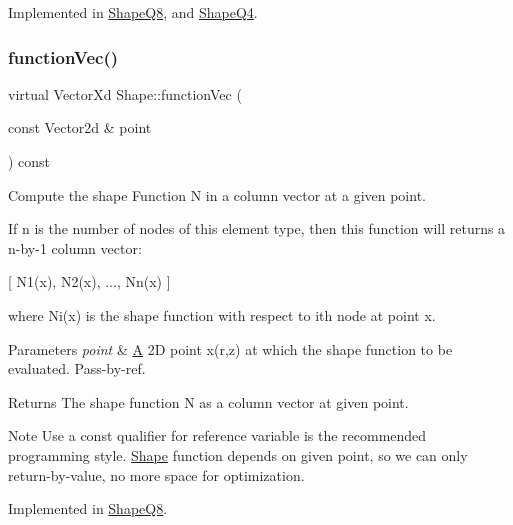 Implemented in \mbox{\hyperlink{class_shape_q8_a7e859a85ee52c8d3ab3051326fc09ab0}{Shape\+Q8}}, and \mbox{\hyperlink{class_shape_q4_a306cacfd4d87384b3d06c2788cafd4ba}{Shape\+Q4}}.

\mbox{\label{class_shape_a0e0400bca54c29b5097c84ace51ecc7b}} 
\subsubsection{\texorpdfstring{function\+Vec()}{functionVec()}}
{\footnotesize\ttfamily virtual Vector\+Xd Shape\+::function\+Vec (\begin{DoxyParamCaption}\item[{const Vector2d \&}]{point }\end{DoxyParamCaption}) const\hspace{0.3cm}{\ttfamily [pure virtual]}}



Compute the shape Function N in a column vector at a given point. 

If n is the number of nodes of this element type, then this function will returns a n-\/by-\/1 column vector\+:

\mbox{[} N1(x), N2(x), ..., Nn(x) \mbox{]}

where Ni(x) is the shape function with respect to ith node at point x.


\begin{DoxyParams}{Parameters}
{\em point} & \mbox{\hyperlink{class_a}{A}} 2D point x(r,z) at which the shape function to be evaluated. Pass-\/by-\/ref. \\
\hline
\end{DoxyParams}
\begin{DoxyReturn}{Returns}
The shape function N as a column vector at given point.
\end{DoxyReturn}
\begin{DoxyNote}{Note}
Use a const qualifier for reference variable is the recommended programming style. \mbox{\hyperlink{class_shape}{Shape}} function depends on given point, so we can only return-\/by-\/value, no more space for optimization. 
\end{DoxyNote}


Implemented in \mbox{\hyperlink{class_shape_q8_a7e2de42658deff3c6912cc102b12cc96}{Shape\+Q8}}.

\mbox{\label{class_shape_afa8029d0991fc5d9054a667823224bd0}} 
